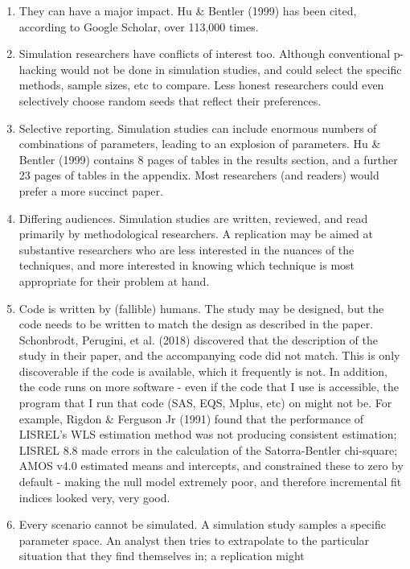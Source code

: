 \documentclass[
  letterpaper,
  DIV=11,
  numbers=noendperiod]{scrartcl}
\begin{document}
\begin{enumerate}
\def\labelenumi{\arabic{enumi}.}
\item
  They can have a major impact. Hu \& Bentler (1999) has been cited,
  according to Google Scholar, over 113,000 times.
\item
  Simulation researchers have conflicts of interest too. Although
  conventional p-hacking would not be done in simulation studies, and
  could select the specific methods, sample sizes, etc to compare. Less
  honest researchers could even selectively choose random seeds that
  reflect their preferences.
\item
  Selective reporting. Simulation studies can include enormous numbers
  of combinations of parameters, leading to an explosion of parameters.
  Hu \& Bentler (1999) contains 8 pages of tables in the results
  section, and a further 23 pages of tables in the appendix. Most
  researchers (and readers) would prefer a more succinct paper.
\item
  Differing audiences. Simulation studies are written, reviewed, and
  read primarily by methodological researchers. A replication may be
  aimed at substantive researchers who are less interested in the
  nuances of the techniques, and more interested in knowing which
  technique is most appropriate for their problem at hand.
\item
  Code is written by (fallible) humans. The study may be designed, but
  the code needs to be written to match the design as described in the
  paper. Schonbrodt, Perugini, et al. (2018) discovered that the
  description of the study in their paper, and the accompanying code did
  not match. This is only discoverable if the code is available, which
  it frequently is not. In addition, the code runs on more software -
  even if the code that I use is accessible, the program that I run that
  code (SAS, EQS, Mplus, etc) on might not be. For example, Rigdon \&
  Ferguson Jr (1991) found that the performance of LISREL's WLS
  estimation method was not producing consistent estimation; LISREL 8.8
  made errors in the calculation of the Satorra-Bentler chi-square; AMOS
  v4.0 estimated means and intercepts, and constrained these to zero by
  default - making the null model extremely poor, and therefore
  incremental fit indices looked very, very good.
\item
  Every scenario cannot be simulated. A simulation study samples a
  specific parameter space. An analyst then tries to extrapolate to the
  particular situation that they find themselves in; a replication might

\end{enumerate}
\end{document}
